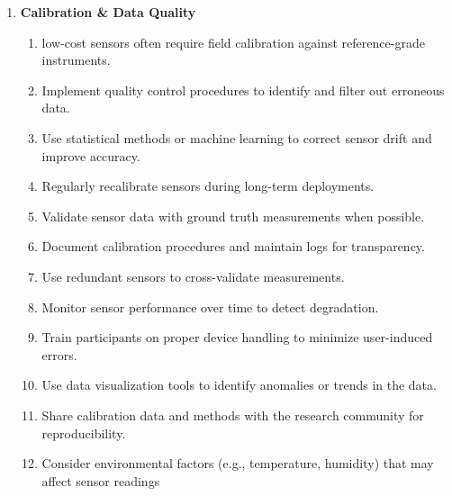 \documentclass[12pt,a4paper]{article}
\begin{document}
\begin{enumerate}
    \item \textbf{Calibration \& Data Quality}
          \begin{enumerate}
              \item low-cost sensors often require field calibration against reference-grade instruments.
              \item Implement quality control procedures to identify and filter out erroneous data.
              \item Use statistical methods or machine learning to correct sensor drift and improve accuracy.
              \item Regularly recalibrate sensors during long-term deployments.
              \item Validate sensor data with ground truth measurements when possible.
              \item Document calibration procedures and maintain logs for transparency.
              \item Use redundant sensors to cross-validate measurements.
              \item Monitor sensor performance over time to detect degradation.
              \item Train participants on proper device handling to minimize user-induced errors.
              \item Use data visualization tools to identify anomalies or trends in the data.
              \item Share calibration data and methods with the research community for reproducibility.
              \item Consider environmental factors (e.g., temperature, humidity) that may affect sensor readings
          \end{enumerate}


\end{enumerate}
\end{document}
